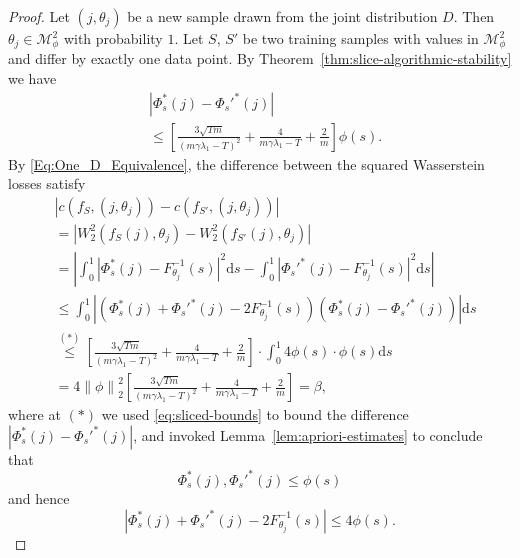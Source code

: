\documentclass[letterpaper]{article} %
\begin{document}
\begin{proof}
  Let $\left( j,\theta_j \right)$ be a new sample drawn from the joint distribution $D$. Then $\theta_j\in\mathcal{M}_{\phi}^2$ with probability $1$. Let $S$, $S'$ be two training samples with values in $\mathcal{M}_{\phi}^2$ and differ by exactly one data point. By Theorem~\ref{thm:slice-algorithmic-stability} we have
  \begin{equation}
    \label{eq:sliced-bounds}
    \begin{aligned}
      &\left| \Phi_s^{*} \left( j \right) -\Phi_s'^{*} \left( j \right) \right| \\
      &\leq \left[\frac{3\sqrt{Tm}}{\left( m\gamma\lambda_1-T \right)^2}+\frac{4}{m\gamma\lambda_1-T}+\frac{2}{m}\right]\phi \left( s \right).
    \end{aligned}
  \end{equation}
By \eqref{Eq:One_D_Equivalence}, the difference between the squared Wasserstein losses satisfy
  \begin{equation*}
    \begin{aligned}
      &\left| c \left( f_S, \left( j,\theta_j \right) \right) - c \left( f_{S'}, \left( j,\theta_j \right) \right) \right|\\
      &=\left| W_2^2 \left( f_S \left( j \right),\theta_j \right) - W_2^2 \left( f_{S'} \left( j \right),\theta_j \right) \right|\\
      &=\left| \int_0^1 \left| \Phi_s^{*} \left( j \right)-F_{\theta_j}^{-1}\left( s \right) \right|^2\mathrm{d}s - \int_0^1 \left| \Phi_s'^{*} \left( j \right)-F_{\theta_j}^{-1}\left( s \right) \right|^2\mathrm{d}s \right|\\
      &\leq \int_0^1 \left| \left( \Phi_s^{*} \left( j \right)+\Phi_s'^{*} \left( j \right)-2F_{\theta_j}^{-1}\left( s \right) \right)\left( \Phi_s^{*} \left( j \right) -\Phi_s'^{*} \left( j \right) \right) \right| \mathrm{d}s\\
      &\stackrel{\left( * \right)}{\leq} \left[\frac{3\sqrt{Tm}}{\left( m\gamma\lambda_1-T \right)^2}+\frac{4}{m\gamma\lambda_1-T}+\frac{2}{m}\right]\cdot \int_0^1 4\phi \left( s \right)\cdot \phi \left( s \right)\mathrm{d}s\\
      &=4\left\| \phi \right\|_2^2\left[\frac{3\sqrt{Tm}}{\left( m\gamma\lambda_1-T \right)^2}+\frac{4}{m\gamma\lambda_1-T}+\frac{2}{m}\right]=\beta,
    \end{aligned}
  \end{equation*}
  where at $\left( * \right)$ we used \eqref{eq:sliced-bounds} to bound the difference $\left| \Phi_s^{*} \left( j \right) -\Phi_s'^{*} \left( j \right) \right|$, and invoked Lemma~\ref{lem:apriori-estimates} to conclude that
  \begin{equation*}
    \Phi_s^{*}\left( j \right),\Phi_s'^{*}\left( j \right) \leq \phi \left( s \right)
  \end{equation*}
  and hence
  \begin{equation*}
    \left| \Phi_s^{*} \left( j \right)+\Phi_s'^{*} \left( j \right)-2F_{\theta_j}^{-1}\left( s \right) \right|\leq 4\phi \left( s \right).
  \end{equation*}
\end{proof}
\end{document}
